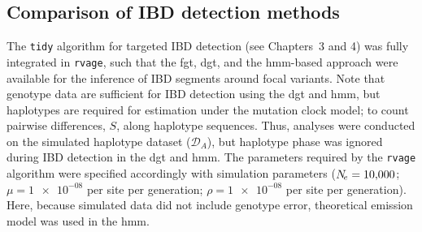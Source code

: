 %


%
\subsection{Comparison of IBD detection methods}
%

The \texttt{tidy} algorithm for targeted IBD detection (see Chapters~3 and 4) was fully integrated in \texttt{rvage}, such that the \gls{fgt}, \gls{dgt}, and the \gls{hmm}-based approach were available for the inference of IBD segments around focal variants.
Note that genotype data are sufficient for IBD detection using the \gls{dgt} and \gls{hmm}, but haplotypes are required for estimation under the mutation clock model; \ie to count pairwise differences, $S$, along haplotype sequences.
Thus, analyses were conducted on the simulated haplotype dataset ($\mathcal{D}_A$), but haplotype phase was ignored during IBD detection in the \gls{dgt} and \gls{hmm}.
The parameters required by the \texttt{rvage} algorithm were specified accordingly with simulation parameters (${N_{\!e} = \num{10000}}$; ${\mu = \num{1e-08}}$ per site per generation; ${\rho = \num{1e-08}}$ per site per generation).
Here, because simulated data did not include genotype error, theoretical emission model was used in the \gls{hmm}.

